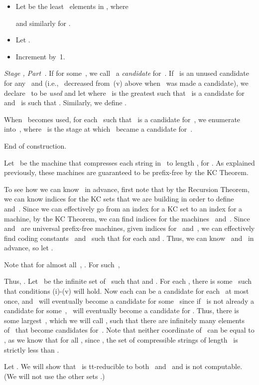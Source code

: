 \documentclass{LMCS}
\newcommand{\0}{\mathbf{0}}
\newcommand{\<}{\langle}
\renewcommand{\>}{\rangle}
\begin{document}
\begin{itemize}
\item Let  be the least~ elements in ,
where

and similarly for .
\item Let .
\item Increment  by~1.
\end{itemize}

{\em Stage , Part~.} If  for some~, we call~ a
{\em candidate} for~. If~ is an unused candidate for any~ and
 (i.e.,~ decreased from~(v) above when~ was made a
candidate), we declare~ to be {\em used} and let 
where~ is the greatest such that~ is a candidate for~ and~ is
such that . Similarly, we define .

When~ becomes used, for each~ such that~ is a candidate for~,
we enumerate  into~, where~ is the stage at
which~ became a candidate for~.

End of construction.

\medskip
Let~ be the machine that compresses each string in~ to length
, for .
As explained previously, these machines are guaranteed to be prefix-free by
the KC Theorem.

To see how we can know~ in advance, first note that by the Recursion
Theorem, we can know indices for the KC sets that we are building in order to
define~ and~.  Since we can effectively go from an index for a KC
set to an index for a machine, by the KC Theorem, we can find indices for the
machines~ and~.  Since~ and~ are universal prefix-free
machines, given indices for~ and~, we can effectively find coding
constants~ and~ such that  for each  and .  Thus, we can know~
and~ in advance, so let .

Note that for almost all~, .  For such~,

Thus, . Let~ be the infinite set of~ such that
 and .  For each , there is some~ such
that conditions (i)-(v) will hold.  Now each  can be a candidate for
each~ at most once, and~ will eventually become a candidate for
some~ since if~ is not already a candidate for some~,~ will
eventually become a candidate for .  Thus, there is some
largest~, which we will call , such that there are infinitely
many elements of~ that become candidates for~.  Note that neither
coordinate of~ can be equal to , as we know that for all
, since , the set of compressible strings of length~ is
strictly less than .

Let .  We will show that~ is tt-reducible to both~
and~ and is not computable.  (We will not use the other sets .)
\end{document}
